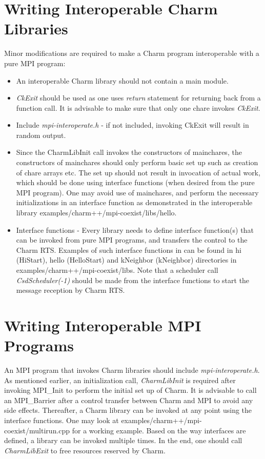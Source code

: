 \section{Writing Interoperable Charm Libraries}
Minor modifications are required to make a Charm program interoperable with a pure
MPI program:
\begin{itemize}
\item An interoperable Charm library should not contain a main module.
\item {\em CkExit} should be used as one uses {\em return} statement for returning
back from a function call. It is advisable to make sure that only one chare
invokes {\em CkExit}.
\item Include {\em mpi-interoperate.h} - if not included, invoking CkExit will result 
in random output.
\item Since the CharmLibInit call invokes the constructors of mainchares, the
constructors of mainchares should only perform basic set up such as creation of chare
arrays etc. The set up should not result in invocation of actual work, which
should be done using interface functions (when desired from the pure MPI
program). One may avoid use of mainchares, and perform the necessary
initializations in an interface function as demonstrated in the interoperable
library examples/charm++/mpi-coexist/libs/hello.
\item Interface functions - Every library needs to define interface function(s) 
that can be invoked from pure MPI programs, and transfers the control to the 
Charm RTS. Examples of such interface functions in can be found in hi
(HiStart), hello (HelloStart) and kNeighbor (kNeighbor) directories in 
examples/charm++/mpi-coexist/libs. Note that a scheduler call {\em
CsdScheduler(-1)} should be made from the interface functions to start the
message reception by Charm RTS.
\end{itemize}

\section{Writing Interoperable MPI Programs}
An MPI program that invokes Charm libraries should include {\em mpi-interoperate.h}. 
As mentioned earlier, an initialization call, {\em CharmLibInit} is 
required after invoking MPI\_Init to perform the initial set up of Charm. 
It is advisable to call an MPI\_Barrier after a control transfer between Charm 
and MPI to avoid any side effects. Thereafter, a Charm library can be invoked at
any point using the interface functions. One may look at
examples/charm++/mpi-coexist/multirun.cpp for a working example. Based on the
way interfaces are defined, a library can be invoked multiple times. In the end,
one should call {\em CharmLibExit} to free resources reserved by Charm.

